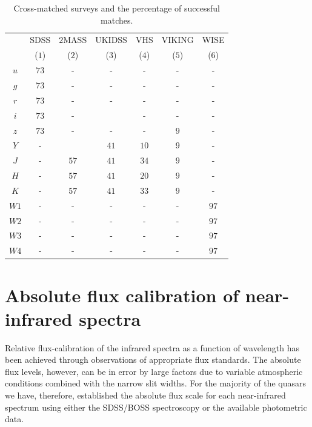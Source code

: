 \begin{table}
  \centering
  \footnotesize 
  \caption{Cross-matched surveys and the percentage of successful matches.}
  \label{tab:cross-matching}
    \begin{tabular}{ccccccc} 
    \hline
     & SDSS & $2$MASS & UKIDSS & VHS & VIKING & WISE \\
     & ($1$) & ($2$) & ($3$) & ($4$) & ($5$) & ($6$) \\ 
    \hline
    $u$ & $73$ & - & - & - & - & - \\
    $g$ & $73$ & - & - & - & - & - \\
    $r$ & $73$ & - & - & - & - & - \\
    $i$ & $73$ & - &  & - & - & - \\
    $z$ & $73$ & - & - & - & $9$ & - \\
    $Y$ & - &  & $41$ & $10$ & 9 & - \\
    $J$ & - & $57$ & $41$ & $34$ & $9$ & - \\
    $H$ & - & $57$ & $41$ & $20$ & $9$ & - \\
    $K$ & - & $57$ & $41$ & $33$ & $9$ & - \\
    $W1$ & - & - & - & - & - & $97$ \\
    $W2$ & - & - & - & - & - & $97$ \\
    $W3$ & - & - & - & - & - & $97$ \\
    $W4$ & - & - & - & - & - & $97$ \\
    \hline
    \end{tabular}
\end{table} 

\section{Absolute flux calibration of near-infrared spectra}

Relative flux-calibration of the infrared spectra as a function of wavelength has been achieved through observations of appropriate flux standards. 
The absolute flux levels, however, can be in error by large factors due to variable atmospheric conditions combined with the narrow slit widths. 
For the majority of the quasars we have, therefore, established the absolute flux scale for each near-infrared spectrum using either the SDSS/BOSS spectroscopy or the available photometric data.

